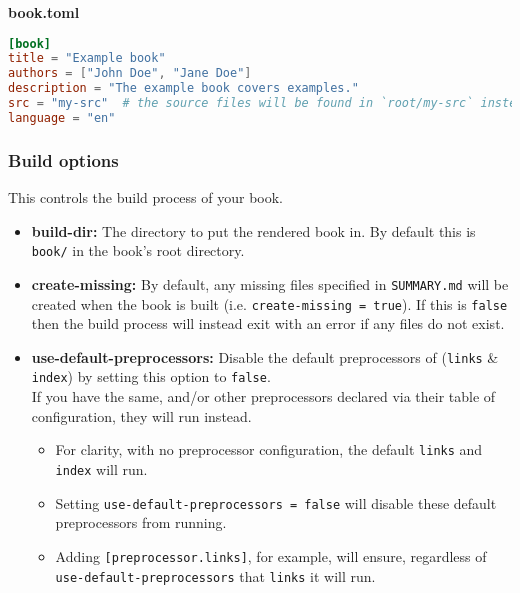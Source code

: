 \documentclass{article}
\begin{document}
\textbf{book.toml}\\
\begin{lstlisting}[language=toml]
[book]
title = "Example book"
authors = ["John Doe", "Jane Doe"]
description = "The example book covers examples."
src = "my-src"  # the source files will be found in `root/my-src` instead of `root/src`
language = "en"

\end{lstlisting}

\subsubsection{Build options}
\label{Build options}
\label{build-options}

This controls the build process of your book.\\
\begin{itemize}
\item 
\textbf{build-dir:} The directory to put the rendered book in. By default this is
\lstinline|book/| in the book's root directory.\\

\item 
\textbf{create-missing:} By default, any missing files specified in \lstinline|SUMMARY.md|
will be created when the book is built (i.e. \lstinline|create-missing = true|). If this
is \lstinline|false| then the build process will instead exit with an error if any files
do not exist.\\

\item 
\textbf{use-default-preprocessors:} Disable the default preprocessors of (\lstinline|links| \&
\lstinline|index|) by setting this option to \lstinline|false|.\\

If you have the same, and/or other preprocessors declared via their table
of configuration, they will run instead.\\
\begin{itemize}
\item For clarity, with no preprocessor configuration, the default \lstinline|links| and
\lstinline|index| will run.
\item Setting \lstinline|use-default-preprocessors = false| will disable these
default preprocessors from running.
\item Adding \lstinline|[preprocessor.links]|, for example, will ensure, regardless of
\lstinline|use-default-preprocessors| that \lstinline|links| it will run.
\end{itemize}

\end{itemize}
\end{document}
